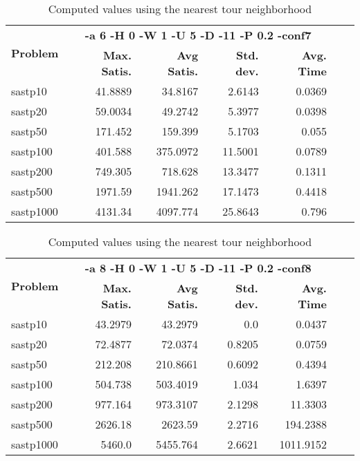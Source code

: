 \documentclass{article}
\begin{document}
\begin{table}[b!]
  \vspace{-6mm}%
  \caption{Computed values using the nearest tour neighborhood}
  \label{tab:NearestTour}
  \setlength{\tabcolsep}{1.4mm}
  \centering
  \begin{tabular}{lrrrrrr}
   \multirow{2}{*}{\bfseries Problem} &
      \multicolumn{4}{c}{\bfseries -a 6 -H 0 -W 1 -U 5 -D -11 -P 0.2 -conf7 } \\
    &
    \bfseries Max. Satis. &
    \bfseries Avg Satis. &
    \bfseries Std. dev. &
    \bfseries Avg. Time 
    \\\hline
   sastp10 & 41.8889 & 34.8167 & 2.6143 & 0.0369 \\ 
sastp20 & 59.0034 & 49.2742 & 5.3977 & 0.0398 \\ 
sastp50 & 171.452 & 159.399 & 5.1703 & 0.055 \\ 
sastp100 & 401.588 & 375.0972 & 11.5001 & 0.0789 \\ 
sastp200 & 749.305 & 718.628 & 13.3477 & 0.1311 \\ 
sastp500 & 1971.59 & 1941.262 & 17.1473 & 0.4418 \\ 
sastp1000 & 4131.34 & 4097.774 & 25.8643 & 0.796

    \\\hline
  \end{tabular}

\end{table}

\begin{table}[b!]
  \vspace{-6mm}%
  \caption{Computed values using the nearest tour neighborhood}
  \label{tab:NearestTour}
  \setlength{\tabcolsep}{1.4mm}
  \centering
  \begin{tabular}{lrrrrrr}
   \multirow{2}{*}{\bfseries Problem} &
      \multicolumn{4}{c}{\bfseries -a 8 -H 0 -W 1 -U 5 -D -11 -P 0.2 -conf8 } \\
    &
    \bfseries Max. Satis. &
    \bfseries Avg Satis. &
    \bfseries Std. dev. &
    \bfseries Avg. Time 
    \\\hline
  sastp10 & 43.2979 & 43.2979 & 0.0 & 0.0437 \\ 
sastp20 & 72.4877 & 72.0374 & 0.8205 & 0.0759 \\ 
sastp50 & 212.208 & 210.8661 & 0.6092 & 0.4394 \\ 
sastp100 & 504.738 & 503.4019 & 1.034 & 1.6397 \\ 
sastp200 & 977.164 & 973.3107 & 2.1298 & 11.3303 \\ 
sastp500 & 2626.18 & 2623.59 & 2.2716 & 194.2388 \\ 
sastp1000 & 5460.0 & 5455.764 & 2.6621 & 1011.9152
    \\\hline
  \end{tabular}

\end{table}
\end{document}
